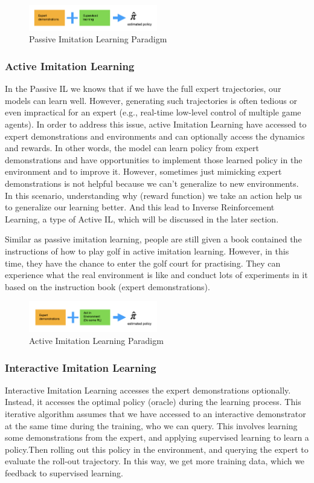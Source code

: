\documentclass[11pt]{article}
\begin{document}
\begin{figure}[h]
\centering
\includegraphics[width=0.5\textwidth]{Passive.png}
\caption{Passive Imitation Learning Paradigm}
\end{figure}

\subsubsection{Active Imitation Learning}
In the Passive IL we knows that if we have the full expert trajectories, our models can learn well. However, generating such trajectories is often tedious or even impractical for an expert (e.g., real-time low-level control of multiple game agents). In order to address this issue, active Imitation Learning have accessed to expert demonstrations and environments and can optionally access the dynamics and rewards. In other words, the model can learn policy from expert demonstrations and have opportunities to implement those learned policy in the environment and to improve it. However, sometimes just mimicking expert demonstrations is not helpful because we can't generalize to new environments. In this scenario, understanding why (reward function) we take an action help us to generalize our learning better. And this lead to Inverse Reinforcement Learning, a type of Active IL, which will be discussed in the later section.

Similar as passive imitation learning, people are still given a book contained the instructions of how to play golf in active imitation learning. However, in this time, they have the chance to enter the golf court for practising. They can experience what the real environment is like and conduct lots of experiments in it based on the instruction book (expert demonstrations).
\begin{figure}[h]
\centering
\includegraphics[width=0.5\textwidth]{Active.png}
\caption{Active Imitation Learning Paradigm}
\end{figure}

\subsubsection{Interactive Imitation Learning}
Interactive Imitation Learning accesses the expert demonstrations optionally. Instead, it accesses the optimal policy (oracle) during the learning process. This iterative algorithm assumes that we have accessed to an interactive demonstrator at the same time during the training, who we can query. This involves learning some demonstrations from the expert, and applying supervised learning to learn a policy.Then rolling out this policy in the environment, and querying the expert to evaluate the roll-out trajectory. In this way, we get more training data, which we feedback to supervised learning.
\end{document}
